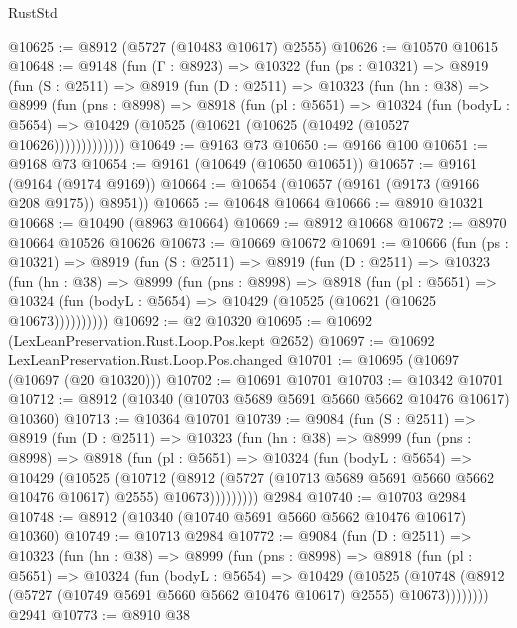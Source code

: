 \begin{lexlean}{RustStd}
\begin{coremodule}
@10625 := @8912 (@5727 (@10483 @10617) @2555)
@10626 := @10570 @10615
@10648 := @9148
    (fun (Γ : @8923) =>
    @10322
      (fun (ps : @10321) =>
      @8919
        (fun (S : @2511) =>
        @8919
          (fun (D : @2511) =>
          @10323
            (fun (hn : @38) =>
            @8999
              (fun (pns : @8998) =>
              @8918
                (fun (pl : @5651) =>
                @10324
                  (fun (bodyL : @5654) =>
                  @10429 (@10525 (@10621 (@10625 (@10492 (@10527 @10626)))))))))))))
@10649 := @9163 @73
@10650 := @9166 @100
@10651 := @9168 @73
@10654 := @9161 (@10649 (@10650 @10651))
@10657 := @9161 (@9164 (@9174 @9169))
@10664 := @10654 (@10657 (@9161 (@9173 (@9166 @208 @9175)) @8951))
@10665 := @10648 @10664
@10666 := @8910 @10321
@10668 := @10490 (@8963 @10664)
@10669 := @8912 @10668
@10672 := @8970 @10664 @10526 @10626
@10673 := @10669 @10672
@10691 := @10666
    (fun (ps : @10321) =>
    @8919
      (fun (S : @2511) =>
      @8919
        (fun (D : @2511) =>
        @10323
          (fun (hn : @38) =>
          @8999
            (fun (pns : @8998) =>
            @8918
              (fun (pl : @5651) =>
              @10324 (fun (bodyL : @5654) => @10429 (@10525 (@10621 (@10625 @10673))))))))))
@10692 := @2 @10320
@10695 := @10692 (LexLeanPreservation.Rust.Loop.Pos.kept @2652)
@10697 := @10692 LexLeanPreservation.Rust.Loop.Pos.changed
@10701 := @10695 (@10697 (@10697 (@20 @10320)))
@10702 := @10691 @10701
@10703 := @10342 @10701
@10712 := @8912 (@10340 (@10703 @5689 @5691 @5660 @5662 @10476 @10617) @10360)
@10713 := @10364 @10701
@10739 := @9084
    (fun (S : @2511) =>
    @8919
      (fun (D : @2511) =>
      @10323
        (fun (hn : @38) =>
        @8999
          (fun (pns : @8998) =>
          @8918
            (fun (pl : @5651) =>
            @10324
              (fun (bodyL : @5654) =>
              @10429
                (@10525
                  (@10712
                    (@8912
                      (@5727 (@10713 @5689 @5691 @5660 @5662 @10476 @10617) @2555)
                      @10673)))))))))
    @2984
@10740 := @10703 @2984
@10748 := @8912 (@10340 (@10740 @5691 @5660 @5662 @10476 @10617) @10360)
@10749 := @10713 @2984
@10772 := @9084
    (fun (D : @2511) =>
    @10323
      (fun (hn : @38) =>
      @8999
        (fun (pns : @8998) =>
        @8918
          (fun (pl : @5651) =>
          @10324
            (fun (bodyL : @5654) =>
            @10429
              (@10525
                (@10748 (@8912 (@5727 (@10749 @5691 @5660 @5662 @10476 @10617) @2555) @10673))))))))
    @2941
@10773 := @8910 @38

\end{coremodule}
\end{lexlean}
